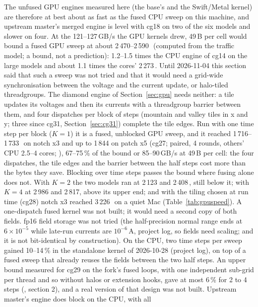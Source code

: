 The unfused GPU engines measured here (the base's and the Swift/Metal kernel) are therefore at best about as fast as
the fused CPU sweep on this machine, and upstream master's merged engine is level with cg18 on two of the six models
and slower on four. At the 121--127\,GB/s the GPU kernels drew, 49\,B per
cell would bound a fused GPU sweep at about 2\,470--2\,590\,\MC\ (computed from the traffic model; a bound, not a
prediction): 1.2--1.5 times the CPU engine of cg14 on the large models and about 1.1 times the cores' 2\,273\,\MC.
Until 2026-11-04 this section said that such a sweep was not tried and that it would need a grid-wide
synchronisation between the voltage and the current update, or halo-tiled threadgroups. The diamond engine of
Section~\ref{sec:gpu} needs neither: a tile updates its voltages and then its currents with a threadgroup barrier
between them, and four dispatches per block of steps (mountain and valley tiles in x and y; three since cg31,
Section~\ref{sec:cg31}) complete the tile edges.
Run with one time step per block ($K=1$) it is a fused, unblocked GPU sweep, and it reached 1\,716--1\,733\,\MC\ on
notch x3 and up to 1\,844 on patch x5 (cg27; paired, 4 rounds, others' CPU 2.5--4 cores;
), 67--75\,\% of the bound or 85--90\,GB/s at 49\,B per cell: the four
dispatches, the tile edges and the barrier between the half steps cost more than the bytes they save. Blocking over
time steps passes the bound where fusing alone does not. With $K=2$ the two models ran at 2\,123 and 2\,408\,\MC,
still below it; with $K=4$ at 2\,986 and 2\,817, above its upper end; and with the tiling chosen at run time (cg28)
notch x3 reached 3\,226\,\MC\ on a quiet Mac (Table~\ref{tab:gpuspeed}). A one-dispatch fused kernel was not built; it
would need a second copy of both fields. fp16 field storage was not tried (the half-precision normal range ends at
$6\times10^{-5}$ while late-run currents are $10^{-6}$\,A, project log, so fields need scaling; and it is not
bit-identical by construction). On the CPU, two time steps per sweep gained 10--14\,\% in the standalone kernel of
2026-10-28 (project log), on top of a fused sweep that already reuses the fields between the two half steps. An upper
bound measured for cg29 on the fork's fused loops, with one independent sub-grid per thread and so without halos or
extension hooks, gave at most 6\,\% for 2 to 4 steps (, section 2), and a
real version of that design was not built. Upstream master's  engine does block on the CPU, with all
